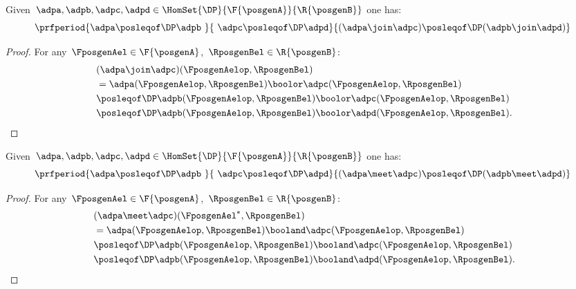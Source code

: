 \begin{lemma}
	\label{lem:coprod_mon}
	Given~$\adpa,\adpb,\adpc,\adpd \in \HomSet{\DP}{\F{\posgenA}}{\R{\posgenB}}$ one has:
	\begin{equation*}
		\prfperiod{\adpa\posleqof\DP \adpb\ }{\ \adpc\posleqof\DP\adpd}{(\adpa\join\adpc)\posleqof\DP (\adpb\join \adpd)}
	\end{equation*}
\end{lemma}
\begin{proof}
	For any~$\FposgenAel\in \F{\posgenA}$,~$\RposgenBel\in \R{\posgenB}$:
	\begin{equation*}
		\begin{aligned}
			~ & (\adpa \join \adpc)(\FposgenAelop,\RposgenBel)                                         \\
			  & =\adpa(\FposgenAelop,\RposgenBel)\boolor \adpc(\FposgenAelop,\RposgenBel)              \\
			  & \posleqof\DP \adpb(\FposgenAelop,\RposgenBel)\boolor \adpc(\FposgenAelop,\RposgenBel)  \\
			  & \posleqof\DP \adpb(\FposgenAelop,\RposgenBel)\boolor \adpd(\FposgenAelop,\RposgenBel).
		\end{aligned}
	\end{equation*}
\end{proof}

\begin{lemma}
	\label{lem:intersection_mon}
	Given~$\adpa,\adpb,\adpc,\adpd \in \HomSet{\DP}{\F{\posgenA}}{\R{\posgenB}}$ one has:
	\begin{equation*}
		\prfperiod{\adpa\posleqof\DP \adpb\ }{\ \adpc\posleqof\DP \adpd}{(\adpa\meet \adpc)\posleqof\DP (\adpb\meet \adpd)}
	\end{equation*}
\end{lemma}
\begin{proof}
	For any~$\FposgenAel\in \F{\posgenA}$,~$\RposgenBel\in \R{\posgenB}$:
	\begin{equation*}
		\begin{aligned}
			~ & (\adpa \meet \adpc)(\FposgenAel^*,\RposgenBel)                                          \\
			  & =\adpa(\FposgenAelop,\RposgenBel)\booland \adpc(\FposgenAelop,\RposgenBel)              \\
			  & \posleqof\DP \adpb(\FposgenAelop,\RposgenBel)\booland \adpc(\FposgenAelop,\RposgenBel)  \\
			  & \posleqof\DP \adpb(\FposgenAelop,\RposgenBel)\booland \adpd(\FposgenAelop,\RposgenBel).
		\end{aligned}
	\end{equation*}
\end{proof}
